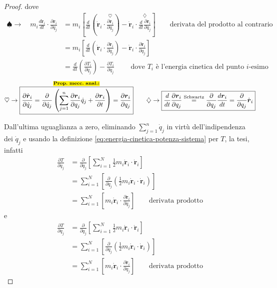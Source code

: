 \documentclass[a4paper,10pt]{article}
\theoremstyle{definition}
\newcommand{\bv}{\boldsymbol} %
\theoremstyle{indentdefinition}
\theoremstyle{indenttheorem}
\theoremstyle{myremark}
\theoremstyle{indentgeneral}
\begin{document}
\begin{proof}
dove
\begin{align*}
\spadesuit\rightarrow\quad  m_{i}\frac{d\dot{\bv{r}}_i}{dt}\cdot\frac{\partial\boldsymbol{r}_{i}}{\partial q_{j}}&=m_{i}\left[\frac{d}{dt}\left(\dot{\bv{r}}_i\cdot\overset{\heartsuit}{\boxed{\frac{\partial\boldsymbol{r}_{i}}{\partial q_{j}}}}\right)-\dot{\bv{r}}_i\cdot\overset{\diamondsuit}{\boxed{\frac{d}{dt}\frac{\partial\boldsymbol{r}_{i}}{\partial q_{j}}}}\right] \qquad\text{derivata del prodotto al contrario} \\
&=m_{i}\left[\frac{d}{dt}\left(\dot{\bv{r}}_i\cdot\frac{\partial\dot{\bv{r}}_i}{\partial\dot{q}_{j}}\right)-\dot{\bv{r}}_i\cdot\frac{\partial\dot{\bv{r}}_i}{\partial q_{j}}\right] \\
&=\frac{d}{dt}\left(\frac{\partial T_i}{\partial \dot{q}_j}\right)-\frac{\partial T_i}{\partial {q}_j} \qquad\text{ dove $T_i$ è l'energia cinetica del punto $i$-esimo}
\end{align*}
$$\heartsuit\rightarrow\overset{\text{\hl{\textbf{Prop. mecc. anal.:}}}}{\boxed{\frac{\partial\dot{\bv{r}}_i}{\partial\dot{q}_{j}}=\frac{\partial}{\partial\dot{q}_{j}}\left(\sum_{j=1}^{n}\frac{\partial\boldsymbol{r}_{i}}{\partial q_{j}}\dot{q}_{j}+\frac{\partial\boldsymbol{r}_{i}}{\partial t}\right)=\frac{\partial\boldsymbol{r}_{i}}{\partial q_{j}}}}\qquad\diamondsuit\rightarrow\boxed{\frac{d}{dt}\frac{\partial\boldsymbol{r}_{i}}{\partial q_{j}}\overset{\text{Schwartz}}{=}\frac{\partial}{\partial q_{j}}\frac{d\boldsymbol{r}_{i}}{dt}=\frac{\partial}{\partial q_{j}}\dot{\bv{r}}_i}$$


Dall'ultima uguaglianza a zero, eliminando $\sum_{j=1}^{n}\dot{q}_{j}$ in virtù dell'indipendenza
dei $\dot{q}_{j}$ e usando la definizione \ref{eq:energia-cinetica-potenza-sistema}
per $T$, la tesi, infatti
\begin{align*}
    \frac{\partial T}{\partial\dot{q}_j}&=\frac{\partial }{\partial \dot{q}_j}\left[\sum_{i=1}^{N}\frac{1}{2}m_i\dot{\bv{r}}_i\cdot \dot{\bv{r}}_i\right] \\
    &= \sum_{i=1}^{N}\left[\frac{\partial }{\partial \dot{q}_j}\left(\frac{1}{2}m_i\dot{\bv{r}}_i\cdot \dot{\bv{r}}_i\right)\right] \\
    &= \sum_{i=1}^{N}\left[m_i\dot{\bv{r}}_i\cdot \frac{\partial \dot{\bv{r}}_i}{\partial \dot{q}_j}\right] \qquad \text{derivata prodotto}
\end{align*} 
e
\begin{align*}
    \frac{\partial T}{\partial q_j}&=\frac{\partial }{\partial q_j}\left[\sum_{i=1}^{N}\frac{1}{2}m_i\dot{\bv{r}}_i\cdot \dot{\bv{r}}_i\right] \\
    &= \sum_{i=1}^{N}\left[\frac{\partial }{\partial q_j}\left(\frac{1}{2}m_i\dot{\bv{r}}_i\cdot \dot{\bv{r}}_i\right)\right] \\
    &= \sum_{i=1}^{N}\left[m_i\dot{\bv{r}}_i\cdot \frac{\partial \dot{\bv{r}}_i}{\partial q_j}\right] \qquad \text{derivata prodotto}
\end{align*} 





\end{proof}
\end{document}
